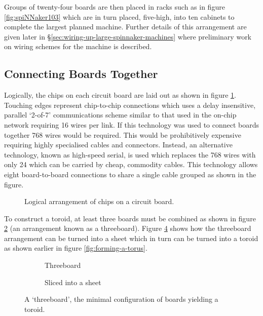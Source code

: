 			Groups of twenty-four boards are then placed in racks such as in figure
			\ref{fig:spiNNaker103} which are in turn placed, five-high, into ten
			cabinets to complete the largest planned machine. Further details of this
			arrangement are given later in
			\S\ref{sec:wiring-up-large-spinnaker-machines} where preliminary work on
			wiring schemes for the machine is described.
		
		\subsection{Connecting Boards Together}
			
			
			Logically, the chips on each circuit board are laid out as shown in figure
			\ref{fig:chipsOnBoard}. Touching edges represent chip-to-chip connections
			which uses a delay insensitive, parallel `2-of-7' communications scheme
			similar to that used in the on-chip network requiring 16 wires per link.
			If this technology was used to connect boards together 768 wires would be
			required.  This would be prohibitively expensive requiring highly
			specialised cables and connectors. Instead, an alternative technology,
			known as high-speed serial, is used which replaces the 768 wires with only
			24 which can be carried by cheap, commodity cables. This technology allows
			eight board-to-board connections to share a single cable grouped as shown in
			the figure.
			
			\begin{figure}
				\center
				
				\caption{Logical arrangement of chips on a circuit board.}
				\label{fig:chipsOnBoard}
			\end{figure}
			
			To construct a toroid, at least three boards must be combined as shown in
			figure \ref{fig:threeboard} (an arrangement known as a threeboard).
			Figure \ref{fig:threeboardSliced} shows how the threeboard arrangement can
			be turned into a sheet which in turn can be turned into a toroid as shown
			earlier in figure \ref{fig:forming-a-torus}.
			
			\begin{figure}
				\begin{subfigure}[b]{0.45\textwidth}
					\center
					
					\caption{Threeboard}
					\label{fig:threeboard}
				\end{subfigure}
				\begin{subfigure}[b]{0.45\textwidth}
					\center
					
					\caption{Sliced into a sheet}
					\label{fig:threeboardSliced}
				\end{subfigure}
				
				\caption[A `threeboard'.]{A `threeboard', the minimal configuration of
				boards yielding a toroid.}
			\end{figure}
			
